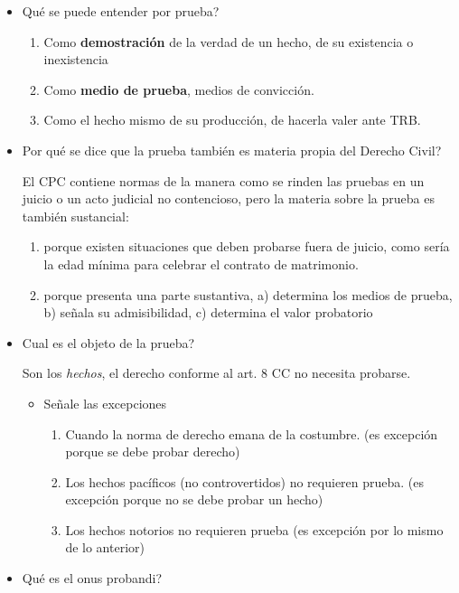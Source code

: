 \documentclass[]{article}
\providecommand{\tightlist}{%
  \setlength{\itemsep}{0pt}\setlength{\parskip}{0pt}}
\begin{document}
\begin{itemize}
\item
  Qué se puede entender por prueba?

  \begin{enumerate}
  \def\labelenumi{\arabic{enumi}.}
  \tightlist
  \item
    Como \textbf{demostración} de la verdad de un hecho, de su
    existencia o inexistencia
  \item
    Como \textbf{medio de prueba}, medios de convicción.
  \item
    Como el hecho mismo de su producción, de hacerla valer ante TRB.
  \end{enumerate}
\item
  Por qué se dice que la prueba también es materia propia del Derecho
  Civil?

  El CPC contiene normas de la manera como se rinden las pruebas en un
  juicio o un acto judicial no contencioso, pero la materia sobre la
  prueba es también sustancial:

  \begin{enumerate}
  \def\labelenumi{\arabic{enumi}.}
  \tightlist
  \item
    porque existen situaciones que deben probarse fuera de juicio, como
    sería la edad mínima para celebrar el contrato de matrimonio.
  \item
    porque presenta una parte sustantiva, a) determina los medios de
    prueba, b) señala su admisibilidad, c) determina el valor probatorio
  \end{enumerate}
\item
  Cual es el objeto de la prueba?

  Son los \emph{hechos}, el derecho conforme al art. 8 CC no necesita
  probarse.

  \begin{itemize}
  \tightlist
  \item
    Señale las excepciones

    \begin{enumerate}
    \def\labelenumi{\arabic{enumi}.}
    \tightlist
    \item
      Cuando la norma de derecho emana de la costumbre. (es excepción
      porque se debe probar derecho)
    \item
      Los hechos pacíficos (no controvertidos) no requieren prueba. (es
      excepción porque no se debe probar un hecho)
    \item
      Los hechos notorios no requieren prueba (es excepción por lo mismo
      de lo anterior)
    \end{enumerate}
  \end{itemize}
\item
  Qué es el onus probandi?


\end{itemize}
\end{document}
